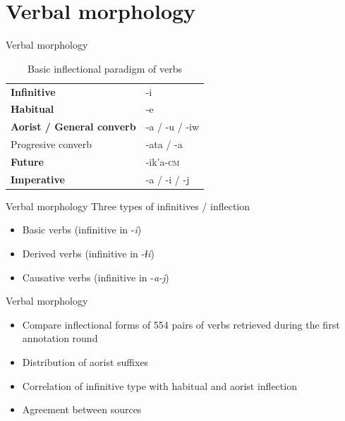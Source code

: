 \section{Verbal morphology}
\begin{frame}{Verbal morphology}

\begin{table}[]
\caption{Basic inflectional paradigm of verbs}
\label{tab:verbinfl}
\begin{tabular}{ll}
{\color[HTML]{CA0887} \textbf{Infinitive}}               & -i            \\
{\color[HTML]{CA0887} \textbf{Habitual}}                 & -e            \\
{\color[HTML]{CA0887} \textbf{Aorist / General converb}} & -a / -u / -iw \\
Progresive converb                                       & -ata / -a     \\
\textbf{Future}                                          & -ik'a-\textsc{cm}      \\
\textbf{Imperative}                                      & -a / -i / -j 
\end{tabular}
\end{table}

\end{frame}

\begin{frame}{Verbal morphology}
Three types of infinitives / inflection

\begin{itemize}
    \item Basic verbs (infinitive in -\textit{i})
    \item Derived verbs (infinitive in -\textit{ɬi})
    \item Causative verbs (infinitive in -\textit{a-j})
\end{itemize}
\end{frame}

\begin{frame}{Verbal morphology}
\begin{itemize}
    \item Compare inflectional forms of 554 pairs of verbs retrieved during the first annotation round
    \item Distribution of aorist suffixes
    \item Correlation of infinitive type with habitual and aorist inflection
    \item Agreement between sources
\end{itemize}
\end{frame}

